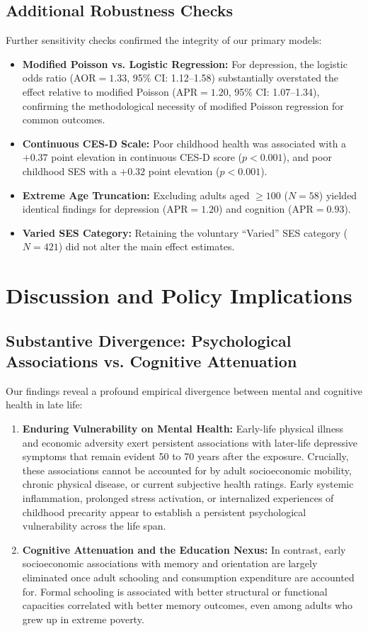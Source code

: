 \documentclass[11pt,a4paper]{article}
\begin{document}
\subsection{Additional Robustness Checks}
Further sensitivity checks confirmed the integrity of our primary models:
\begin{itemize}
    \item \textbf{Modified Poisson vs. Logistic Regression:} For depression, the logistic odds ratio ($\text{AOR} = 1.33$, 95\% CI: 1.12--1.58) substantially overstated the effect relative to modified Poisson ($\text{APR} = 1.20$, 95\% CI: 1.07--1.34), confirming the methodological necessity of modified Poisson regression for common outcomes.
    \item \textbf{Continuous CES-D Scale:} Poor childhood health was associated with a $+0.37$ point elevation in continuous CES-D score ($p < 0.001$), and poor childhood SES with a $+0.32$ point elevation ($p < 0.001$).
    \item \textbf{Extreme Age Truncation:} Excluding adults aged $\ge 100$ ($N = 58$) yielded identical findings for depression ($\text{APR} = 1.20$) and cognition ($\text{APR} = 0.93$).
    \item \textbf{Varied SES Category:} Retaining the voluntary ``Varied'' SES category ($N = 421$) did not alter the main effect estimates.
\end{itemize}

\section{Discussion and Policy Implications}

\subsection{Substantive Divergence: Psychological Associations vs. Cognitive Attenuation}
Our findings reveal a profound empirical divergence between mental and cognitive health in late life:
\begin{enumerate}
    \item \textbf{Enduring Vulnerability on Mental Health:} Early-life physical illness and economic adversity exert persistent associations with later-life depressive symptoms that remain evident 50 to 70 years after the exposure. Crucially, these associations cannot be accounted for by adult socioeconomic mobility, chronic physical disease, or current subjective health ratings. Early systemic inflammation, prolonged stress activation, or internalized experiences of childhood precarity appear to establish a persistent psychological vulnerability across the life span.
    \item \textbf{Cognitive Attenuation and the Education Nexus:} In contrast, early socioeconomic associations with memory and orientation are largely eliminated once adult schooling and consumption expenditure are accounted for. Formal schooling is associated with better structural or functional capacities correlated with better memory outcomes, even among adults who grew up in extreme poverty.
\end{enumerate}
\end{document}
